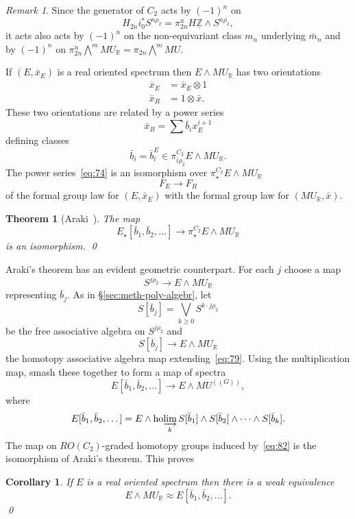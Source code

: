 \documentclass{amsart}
\newtheorem{thm}[equation]{Theorem}
\newtheorem{cor}[equation]{Corollary}
\newtheorem{rem}[equation]{Remark}
\theoremstyle{definition}
\theoremstyle{remark}
\newtheorem{rem}[equation]{Remark}
\newcommand{\Z}{{\mathbb Z}}
\newcommand{\R}{{\mathbb R}}
\newcommand{\mur}{MU_{\R}}
\newcommand{\mutn}[1]{MU^{(\!(#1)\!)}}
\DeclareMathOperator{\ho}{ho}
\newcommand{\piu}{\pi^{u}}
\newcommand{\Zm}{\underline{\Z}}
\newcommand{\mm}{m}
\newcommand{\gbar}{\bar}
\newcommand{\hocolim}{\ho\!\varinjlim}
\newcommand{\zt}{C_{2}}
\begin{document}
\begin{rem}
\label{rem:12} Since the generator of $\zt$ acts by $(-1)^{n}$ on
\[
H_{2n}i_{0}^{\ast}S^{n\rho_{2}}=\piu_{2n}H\Zm\wedge S^{n\rho_{2}},
\]
it acts also acts by $(-1)^{n}$ on the non-equivariant class $m_{n}$
underlying $\gbar{\mm}_{n}$ and by $(-1)^{n}$ on
$\piu_{2n}\bigwedge^{m}\mur=\pi_{2n}\bigwedge^{m}MU$.
\end{rem}


If $(E, \gbar{x}_{E})$ is a real oriented spectrum then $E\wedge \mur$
has two orientations
\begin{align*}
\gbar{x}_{E} &= \gbar{x}_{E}\otimes 1 \\
\gbar{x}_{R} &= 1\otimes\gbar{x}.
\end{align*}
These two orientations are related by a power series
\begin{equation}\label{eq:74}
\gbar{x}_{R} = \sum \gbar{b}_{i}x_{E}^{i+1}
\end{equation}
defining classes
\[
\gbar{b}_{i}=\gbar{b}^{E}_{i}\in \pi^{\zt}_{i\rho_{2}}E\wedge \mur.
\]
The power series~\eqref{eq:74} is an isomorphism over
$\pi^{\zt}_{\star}E\wedge\mur$
\[
F_{E}\to F_{R}
\]
of the formal group law for $(E, \gbar{x}_{E})$ with the formal group
law for $(\mur,\gbar{x})$.

\begin{thm}[Araki~\cite{MR614829}]\label{thm:28}
The map
\[
E_{\star}[\gbar{b}_{1},\gbar{b}_{2},\dots] \to \pi^{\zt}_{\star}E\wedge \mur
\]
is an isomorphism.
\qed
\end{thm}

Araki's theorem has an evident geometric counterpart.  For each $j$
choose a map
\[
S^{j\rho_{2}}\to E\wedge \mur
\]
representing $\gbar{b}_{j}$.  As in \S\ref{sec:meth-poly-algebr}, let
\[
S[\gbar{b}_{j}]=\bigvee_{k\ge 0}S^{k\cdot j\rho_{2}}
\]
be the free associative algebra on $S^{j\rho_{2}}$ and
\[
S[\gbar{b}_{j}]\to E\wedge \mur
\]
the homotopy associative algebra map extending~\eqref{eq:79}.  Using
the multiplication map, smash these together to form a map of spectra
\begin{equation}\label{eq:82}
E[\gbar{b}_{1},\gbar{b}_{2},\dots]\to E\wedge\mutn{G},
\end{equation}
where
\[
E[\gbar{b}_{1},\gbar{b}_{2},\dots] = E\wedge \hocolim_{k}S[\gbar{b}_{1}]\wedge
S[\gbar{b}_{2}]\wedge\cdots\wedge S[\gbar{b}_{k}].
\]
The map on $RO(\zt)$-graded homotopy groups induced by~\eqref{eq:82}
is the isomorphism of Araki's theorem.   This proves
\begin{cor}
\label{thm:175}
If $E$ is a real oriented spectrum then there is a weak equivalence
\[
E\wedge\mur \approx E[\gbar{b}_{1},\gbar{b}_{2},\dots].
\]
\qed
\end{cor}
\end{document}

